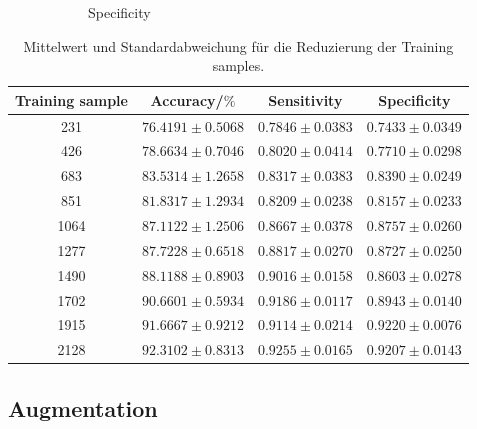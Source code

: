 \begin{figure}[H]
\begin{subfigure}[b]{0.48\textwidth}
    \caption{Specificity}
    \label{fig:gli-men-spec}
  \end{subfigure}
  \caption{}
  \label{fig:gli-men-reduktion}
\end{figure}

\begin{table}[H]
    \centering
        \begin{tabular}{cccc}
            \toprule
            Training sample & Accuracy/$\%$ & Sensitivity & Specificity\\
            \midrule
            231  & $76.4191 \pm 0.5068$ & $0.7846 \pm 0.0383$ & $0.7433 \pm 0.0349$\\
            426  & $78.6634 \pm 0.7046$ & $0.8020 \pm 0.0414$ & $0.7710 \pm 0.0298$\\
            683  & $83.5314 \pm 1.2658$ & $0.8317 \pm 0.0383$ & $0.8390 \pm 0.0249$\\
            851  & $81.8317 \pm 1.2934$ & $0.8209 \pm 0.0238$ & $0.8157 \pm 0.0233$\\
            1064 & $87.1122 \pm 1.2506$ & $0.8667 \pm 0.0378$ & $0.8757 \pm 0.0260$\\
            1277 & $87.7228 \pm 0.6518$ & $0.8817 \pm 0.0270$ & $0.8727 \pm 0.0250$\\
            1490 & $88.1188 \pm 0.8903$ & $0.9016 \pm 0.0158$ & $0.8603 \pm 0.0278$\\
            1702 & $90.6601 \pm 0.5934$ & $0.9186 \pm 0.0117$ & $0.8943 \pm 0.0140$\\
            1915 & $91.6667 \pm 0.9212$ & $0.9114 \pm 0.0214$ & $0.9220 \pm 0.0076$\\
            2128 & $92.3102 \pm 0.8313$ & $0.9255 \pm 0.0165$ & $0.9207 \pm 0.0143$\\            
            \bottomrule
        \end{tabular}
  \caption{Mittelwert und Standardabweichung für die Reduzierung der Training samples.}
  \label{tab:}
\end{table}

\subsection{Augmentation}

